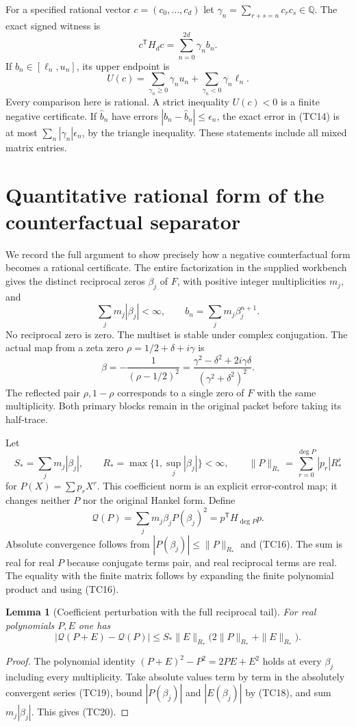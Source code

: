 \documentclass[11pt]{article}
\newtheorem{lemma}[theorem]{Lemma}
\newcommand{\Q}{\mathbb Q}
\begin{document}
For a specified rational vector $c=(c_0,\ldots,c_d)$ let
$\gamma_n=\sum_{r+s=n}c_rc_s\in\Q$. The exact signed witness is
\[
c^{\mathsf T}H_dc=\sum_{n=0}^{2d}\gamma_nb_n.
\tag{TC14}
\]
If $b_n\in[\ell_n,u_n]$, its upper endpoint is
\[
U(c)=
\sum_{\gamma_n\ge0}\gamma_nu_n
+\sum_{\gamma_n<0}\gamma_n\ell_n.
\tag{TC15}
\]
Every comparison here is rational. A strict inequality $U(c)<0$
is a finite negative certificate. If $\widehat b_n$ have errors
$|b_n-\widehat b_n|\le\epsilon_n$, the exact error in (TC14)
is at most $\sum_n|\gamma_n|\epsilon_n$, by the triangle
inequality. These statements include all mixed matrix entries.

\section{Quantitative rational form of the counterfactual separator}
We record the full argument to show precisely how a negative
counterfactual form becomes a rational certificate. The entire
factorization in the supplied workbench gives the distinct reciprocal
zeros $\beta_j$ of $F$, with positive integer multiplicities $m_j$,
and
\[
\sum_jm_j|\beta_j|<\infty,\qquad
b_n=\sum_jm_j\beta_j^{n+1}.
\tag{TC16}
\]
No reciprocal zero is zero. The multiset is stable under complex
conjugation. The actual map from a zeta zero
$\rho=1/2+\delta+i\gamma$ is
\[
\beta=-\frac{1}{(\rho-1/2)^2}
=\frac{\gamma^2-\delta^2+2i\gamma\delta}
{(\gamma^2+\delta^2)^2}.
\tag{TC17}
\]
The reflected pair $\rho,1-\rho$ corresponds to a single zero of
$F$ with the same multiplicity. Both primary blocks remain in
the original packet before taking its half-trace.

Let
\[
S_*=\sum_jm_j|\beta_j|,\qquad
R_*=\max\{1,\sup_j|\beta_j|\}<\infty,\qquad
\|P\|_{R_*}=\sum_{r=0}^{\deg P}|p_r|R_*^r
\tag{TC18}
\]
for $P(X)=\sum p_rX^r$. This coefficient norm is an explicit
error-control map; it changes neither $P$ nor the original Hankel
form. Define
\[
\mathcal Q(P)=\sum_jm_j\beta_jP(\beta_j)^2
=p^{\mathsf T}H_{\deg P}p.
\tag{TC19}
\]
Absolute convergence follows from
$|P(\beta_j)|\le\|P\|_{R_*}$ and (TC16). The sum is real for
real $P$ because conjugate terms pair, and real reciprocal terms
are real. The equality with the finite matrix follows by expanding
the finite polynomial product and using (TC16).

\begin{lemma}[Coefficient perturbation with the full reciprocal tail]
For real polynomials $P,E$ one has
\[
|\mathcal Q(P+E)-\mathcal Q(P)|
\le S_*\|E\|_{R_*}\bigl(2\|P\|_{R_*}+\|E\|_{R_*}\bigr).
\tag{TC20}
\]
\end{lemma}
\begin{proof}
The polynomial identity $(P+E)^2-P^2=2PE+E^2$ holds at every
$\beta_j$ including every multiplicity. Take absolute values
term by term in the absolutely convergent series (TC19), bound
$|P(\beta_j)|$ and $|E(\beta_j)|$ by (TC18), and sum
$m_j|\beta_j|$. This gives (TC20).
\end{proof}
\end{document}
